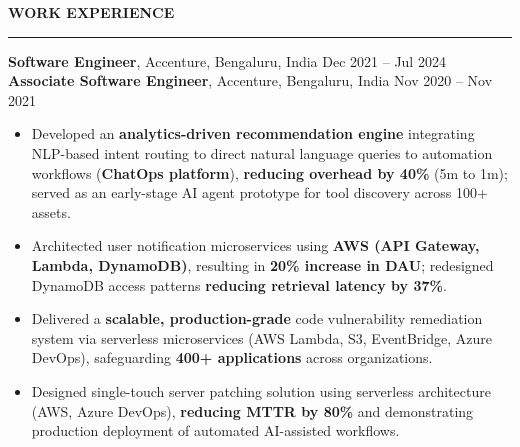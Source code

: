 \documentclass[letterpaper,10.5pt]{extarticle}
\newcommand{\resumesection}[1]{%
    \vspace{6pt}%
    \noindent\textbf{#1}\vspace{-5pt}%
    \\\noindent\rule{\textwidth}{0.5pt}%
    \vspace{1pt}%
}
\begin{document}
\resumesection{WORK EXPERIENCE}

\noindent\textbf{Software Engineer}, Accenture, Bengaluru, India \hfill Dec 2021 -- Jul 2024\\
\textbf{Associate Software Engineer}, Accenture, Bengaluru, India \hfill Nov 2020 -- Nov 2021

\begin{itemize}[leftmargin=12pt, topsep=1pt, itemsep=0pt, parsep=0pt]
    \item Developed an \textbf{analytics-driven recommendation engine} integrating NLP-based intent routing to direct natural language queries to automation workflows (\textbf{ChatOps platform}), \textbf{reducing overhead by 40\%} (5m to 1m); served as an early-stage AI agent prototype for tool discovery across 100+ assets.
    \item Architected user notification microservices using \textbf{AWS (API Gateway, Lambda, DynamoDB)}, resulting in \textbf{20\% increase in DAU}; redesigned DynamoDB access patterns \textbf{reducing retrieval latency by 37\%}.
    \item Delivered a \textbf{scalable, production-grade} code vulnerability remediation system via serverless microservices (AWS Lambda, S3, EventBridge, Azure DevOps), safeguarding \textbf{400+ applications} across organizations.
    \item Designed single-touch server patching solution using serverless architecture (AWS, Azure DevOps), \textbf{reducing MTTR by 80\%} and demonstrating production deployment of automated AI-assisted workflows.
\end{itemize}
\end{document}
